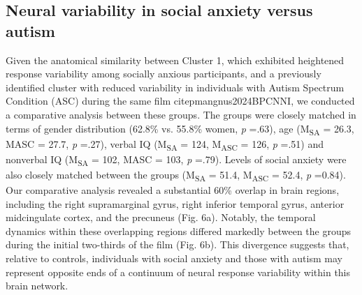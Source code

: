 \subsection*{Neural variability in social anxiety versus autism}
Given the anatomical similarity between Cluster 1, which exhibited heightened response variability among socially anxious participants, and a previously identified cluster with reduced variability in individuals with Autism Spectrum Condition (ASC) during the same film citep{mangnus2024BPCNNI}, we conducted a comparative analysis between these groups. The groups were closely matched in terms of gender distribution (62.8\% vs. 55.8\% women, \textit{p} =.63), age (M\textsubscript{SA} = 26.3, MASC = 27.7, \textit{p} =.27), verbal IQ (M\textsubscript{SA} = 124, M\textsubscript{ASC} = 126, \textit{p} =.51) and nonverbal IQ (M\textsubscript{SA} = 102, MASC = 103, \textit{p} =.79). Levels of social anxiety were also closely matched between the groups (M\textsubscript{SA} = 51.4, M\textsubscript{ASC} = 52.4, \textit{p} =0.84). Our comparative analysis revealed a substantial 60\% overlap in brain regions, including the right supramarginal gyrus, right inferior temporal gyrus, anterior midcingulate cortex, and the precuneus (Fig. 6a). Notably, the temporal dynamics within these overlapping regions differed markedly between the groups during the initial two-thirds of the film (Fig. 6b). This divergence suggests that, relative to controls, individuals with social anxiety and those with autism may represent opposite ends of a continuum of neural response variability within this brain network.

